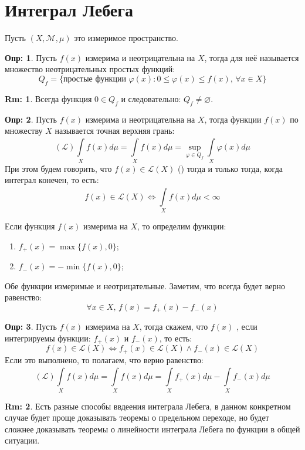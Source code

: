 \documentclass[12pt]{article}
\newcommand{\ML}{\mathcal{L}}
\newcommand{\MM}{\mathcal{M}}
\newcommand{\VN}{\varnothing}
\theoremstyle{definition}
\newtheorem{defn}{Опр:}
\newtheorem{rem}{Rm:}
\newcommand{\ddint}[2]{\displaystyle\int\limits_{#1}^{#2}}
\begin{document}
\newpage
\section*{Интеграл Лебега}

Пусть $(X, \MM,\mu)$ это измеримое пространство.

\begin{defn}
	Пусть $f(x)$ измерима и неотрицательна на $X$, тогда  для неё называется множество неотрицательных простых функций: 
	$$
		Q_f = \{\text{простые функции } \varphi(x) \colon 0 \leq \varphi(x) \leq f(x), \, \forall x \in X\}
	$$
\end{defn}

\begin{rem}
	Всегда функция $0 \in Q_f$ и следовательно: $Q_f  \neq \VN$.
\end{rem}

\begin{defn}
	Пусть $f(x)$ измерима и неотрицательна на $X$, тогда  функции $f(x)$ по множеству $X$ называется точная верхняя грань:
	$$
		(\ML) \ddint{X}{}f(x)d\mu = \ddint{X}{}f(x) d\mu = \sup\limits_{\varphi \in Q_f} \ddint{X}{}\varphi(x) d\mu
	$$
	При этом будем говорить, что $f(x) \in \ML(X)$ () тогда и только тогда, когда интеграл конечен, то есть:
	$$
		f(x) \in \ML(X) \Leftrightarrow \ddint{X}{}f(x)d\mu < \infty
	$$
\end{defn}

Если функция $f(x)$ измерима на $X$, то определим функции:
\begin{enumerate}[label=\arabic*)]
	\item $f_{+}(x) = \max\{f(x), 0\}$;
	\item $f_{-}(x) = - \min\{f(x),0\}$;
\end{enumerate}
Обе функции измеримые и неотрицательные. Заметим, что всегда будет верно равенство:
$$
	\forall x \in X, \, f(x) = f_{+}(x) - f_{-}(x)
$$
\begin{defn}
	Пусть $f(x)$ измерима на $X$, тогда скажем, что $f(x)$ , если интегрируемы функции: $f_{+}(x)$ и $f_{-}(x)$, то есть: 
	$$
		f(x) \in \ML(X) \Leftrightarrow f_{+}(x) \in \ML(X) \wedge f_{-}(x) \in \ML(X)
	$$
	Если это выполнено, то полагаем, что верно равенство:
	$$
		(\ML) \ddint{X}{}f(x)d\mu  = \ddint{X}{}f(x)d\mu = \ddint{X}{}f_{+}(x) d\mu - \ddint{X}{}f_{-}(x)d\mu
	$$
\end{defn}
\begin{rem}
	Есть разные способы ввдеения интеграла Лебега, в данном конкретном случае будет проще доказывать теоремы о предельном переходе, но будет сложнее доказывать теоремы о линейности интеграла Лебега по функции в общей ситуации.
\end{rem}
\end{document}
